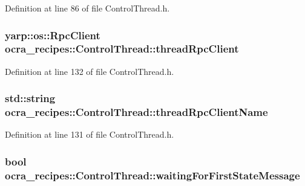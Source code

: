 Definition at line 86 of file Control\+Thread.\+h.

\subsubsection[{\texorpdfstring{thread\+Rpc\+Client}{threadRpcClient}}]{\setlength{\rightskip}{0pt plus 5cm}yarp\+::os\+::\+Rpc\+Client ocra\+\_\+recipes\+::\+Control\+Thread\+::thread\+Rpc\+Client\hspace{0.3cm}{\ttfamily [protected]}}\hypertarget{classocra__recipes_1_1ControlThread_a7c63f87c66ca64787e6f798a7db28e20}{}\label{classocra__recipes_1_1ControlThread_a7c63f87c66ca64787e6f798a7db28e20}


Definition at line 132 of file Control\+Thread.\+h.

\subsubsection[{\texorpdfstring{thread\+Rpc\+Client\+Name}{threadRpcClientName}}]{\setlength{\rightskip}{0pt plus 5cm}std\+::string ocra\+\_\+recipes\+::\+Control\+Thread\+::thread\+Rpc\+Client\+Name\hspace{0.3cm}{\ttfamily [protected]}}\hypertarget{classocra__recipes_1_1ControlThread_af9d8abd531163281ac938eeb0ba51979}{}\label{classocra__recipes_1_1ControlThread_af9d8abd531163281ac938eeb0ba51979}


Definition at line 131 of file Control\+Thread.\+h.

\subsubsection[{\texorpdfstring{waiting\+For\+First\+State\+Message}{waitingForFirstStateMessage}}]{\setlength{\rightskip}{0pt plus 5cm}bool ocra\+\_\+recipes\+::\+Control\+Thread\+::waiting\+For\+First\+State\+Message\hspace{0.3cm}{\ttfamily [protected]}}\hypertarget{classocra__recipes_1_1ControlThread_aaef2c765c3900ebc72125f7a8fd4240e}{}\label{classocra__recipes_1_1ControlThread_aaef2c765c3900ebc72125f7a8fd4240e}


